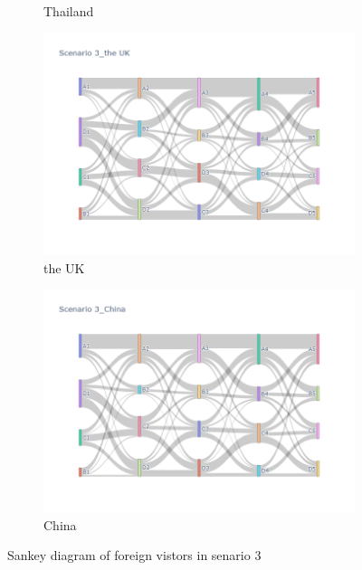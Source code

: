 \begin{figure}[h]
\begin{subfigure}{0.5\textwidth}
    \caption{Thailand}
  \end{subfigure}
  \begin{subfigure}{0.5\textwidth}
    \centering
    \includegraphics[width=\linewidth]{Figure/figure35c.png}
    \caption{the UK}
  \end{subfigure}
  \begin{subfigure}{0.5\textwidth}
    \centering
    \includegraphics[width=\linewidth]{Figure/figure36c.png}
    \caption{China}
  \end{subfigure}
  \caption{ Sankey diagram of foreign vistors in senario 3 }
  \label{fig34}
\end{figure}


